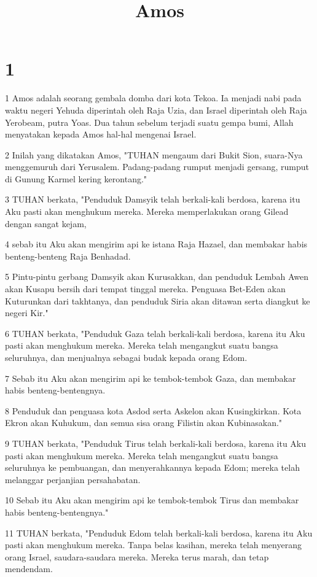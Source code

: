 

\title{Amos}


\chapter{1}

\par 1 Amos adalah seorang gembala domba dari kota Tekoa. Ia menjadi nabi pada waktu negeri Yehuda diperintah oleh Raja Uzia, dan Israel diperintah oleh Raja Yerobeam, putra Yoas. Dua tahun sebelum terjadi suatu gempa bumi, Allah menyatakan kepada Amos hal-hal mengenai Israel.
\par 2 Inilah yang dikatakan Amos, "TUHAN mengaum dari Bukit Sion, suara-Nya menggemuruh dari Yerusalem. Padang-padang rumput menjadi gersang, rumput di Gunung Karmel kering kerontang."
\par 3 TUHAN berkata, "Penduduk Damsyik telah berkali-kali berdosa, karena itu Aku pasti akan menghukum mereka. Mereka memperlakukan orang Gilead dengan sangat kejam,
\par 4 sebab itu Aku akan mengirim api ke istana Raja Hazael, dan membakar habis benteng-benteng Raja Benhadad.
\par 5 Pintu-pintu gerbang Damsyik akan Kurusakkan, dan penduduk Lembah Awen akan Kusapu bersih dari tempat tinggal mereka. Penguasa Bet-Eden akan Kuturunkan dari takhtanya, dan penduduk Siria akan ditawan serta diangkut ke negeri Kir."
\par 6 TUHAN berkata, "Penduduk Gaza telah berkali-kali berdosa, karena itu Aku pasti akan menghukum mereka. Mereka telah mengangkut suatu bangsa seluruhnya, dan menjualnya sebagai budak kepada orang Edom.
\par 7 Sebab itu Aku akan mengirim api ke tembok-tembok Gaza, dan membakar habis benteng-bentengnya.
\par 8 Penduduk dan penguasa kota Asdod serta Askelon akan Kusingkirkan. Kota Ekron akan Kuhukum, dan semua sisa orang Filistin akan Kubinasakan."
\par 9 TUHAN berkata, "Penduduk Tirus telah berkali-kali berdosa, karena itu Aku pasti akan menghukum mereka. Mereka telah mengangkut suatu bangsa seluruhnya ke pembuangan, dan menyerahkannya kepada Edom; mereka telah melanggar perjanjian persahabatan.
\par 10 Sebab itu Aku akan mengirim api ke tembok-tembok Tirus dan membakar habis benteng-bentengnya."
\par 11 TUHAN berkata, "Penduduk Edom telah berkali-kali berdosa, karena itu Aku pasti akan menghukum mereka. Tanpa belas kasihan, mereka telah menyerang orang Israel, saudara-saudara mereka. Mereka terus marah, dan tetap mendendam.
